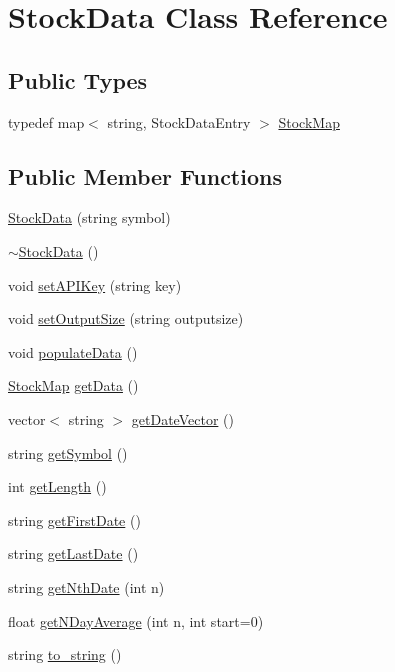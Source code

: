 \hypertarget{class_stock_data}{}\section{Stock\+Data Class Reference}
\label{class_stock_data}
\subsection*{Public Types}
\begin{DoxyCompactItemize}
\item 
typedef map$<$ string, Stock\+Data\+Entry $>$ \hyperlink{class_stock_data_afeca76dd17c6994d8f5b50db218a7985}{Stock\+Map}
\end{DoxyCompactItemize}
\subsection*{Public Member Functions}
\begin{DoxyCompactItemize}
\item 
\hyperlink{class_stock_data_a699e605a9e00cbb0dd9fbedfb8bde210}{Stock\+Data} (string symbol)
\item 
\hyperlink{class_stock_data_a3a718a2a3230151ea6deafbe6e6655ef}{$\sim$\+Stock\+Data} ()
\item 
void \hyperlink{class_stock_data_a8c319a48fd323b0c558781c67f5a54da}{set\+A\+P\+I\+Key} (string key)
\item 
void \hyperlink{class_stock_data_a08b31780c3cd0c69d8d559772a0e2bf3}{set\+Output\+Size} (string outputsize)
\item 
void \hyperlink{class_stock_data_ae2886fb07824007f86649d4dc8f3c0fb}{populate\+Data} ()
\item 
\hyperlink{class_stock_data_afeca76dd17c6994d8f5b50db218a7985}{Stock\+Map} \hyperlink{class_stock_data_aabd85982241d827d8fa9a8b507183a5c}{get\+Data} ()
\item 
vector$<$ string $>$ \hyperlink{class_stock_data_a2a9a35e4865ed62696f9429aa315fa19}{get\+Date\+Vector} ()
\item 
string \hyperlink{class_stock_data_a034b3a4da53cca30074727917b2fff0e}{get\+Symbol} ()
\item 
int \hyperlink{class_stock_data_aa4a8459065b03adb72eb5fee21c55c54}{get\+Length} ()
\item 
string \hyperlink{class_stock_data_a494532644c45cc806ef9127a947dc660}{get\+First\+Date} ()
\item 
string \hyperlink{class_stock_data_afad979060a524f089da0ebd08f6904e8}{get\+Last\+Date} ()
\item 
string \hyperlink{class_stock_data_a75f3ee11d000a235c502df21aaa6f479}{get\+Nth\+Date} (int n)
\item 
float \hyperlink{class_stock_data_a003f4c513365d8f262ea162381fe3c91}{get\+N\+Day\+Average} (int n, int start=0)
\item 
string \hyperlink{class_stock_data_a73bc8ed4f4c3e9af7128679a219ade47}{to\+\_\+string} ()
\end{DoxyCompactItemize}


